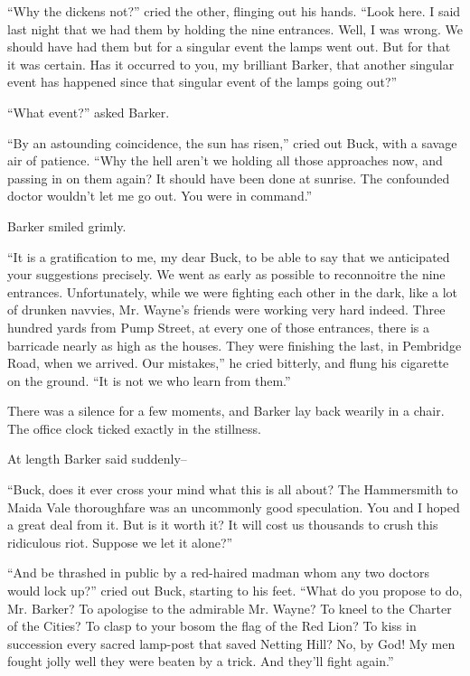 \documentclass{book}
\begin{document}
“Why the dickens not?” cried the other, flinging out his hands. “Look here. I said last night that we had them by holding the nine entrances. Well, I was wrong. We should have had them but for a singular event the lamps went out. But for that it was certain. Has it occurred to you, my brilliant Barker, that another singular event has happened since that singular event of the lamps going out?”

“What event?” asked Barker.

“By an astounding coincidence, the sun has risen,” cried out Buck, with a savage air of patience. “Why the hell aren’t we holding all those approaches now, and passing in on them again? It should have been done at sunrise. The confounded doctor wouldn’t let me go out. You were in command.”

Barker smiled grimly.

“It is a gratification to me, my dear Buck, to be able to say that we anticipated your suggestions precisely. We went as early as possible to reconnoitre the nine entrances. Unfortunately, while we were fighting each other in the dark, like a lot of drunken navvies, Mr. Wayne’s friends were working very hard indeed. Three hundred yards from Pump Street, at every one of those entrances, there is a barricade nearly as high as the houses. They were finishing the last, in Pembridge Road, when we arrived. Our mistakes,” he cried bitterly, and flung his cigarette on the ground. “It is not we who learn from them.”

There was a silence for a few moments, and Barker lay back wearily in a chair. The office clock ticked exactly in the stillness.

At length Barker said suddenly–

“Buck, does it ever cross your mind what this is all about? The Hammersmith to Maida Vale thoroughfare was an uncommonly good speculation. You and I hoped a great deal from it. But is it worth it? It will cost us thousands to crush this ridiculous riot. Suppose we let it alone?”

“And be thrashed in public by a red-haired madman whom any two doctors would lock up?” cried out Buck, starting to his feet. “What do you propose to do, Mr. Barker? To apologise to the admirable Mr. Wayne? To kneel to the Charter of the Cities? To clasp to your bosom the flag of the Red Lion? To kiss in succession every sacred lamp-post that saved Netting Hill? No, by God! My men fought jolly well they were beaten by a trick. And they’ll fight again.”
\end{document}
